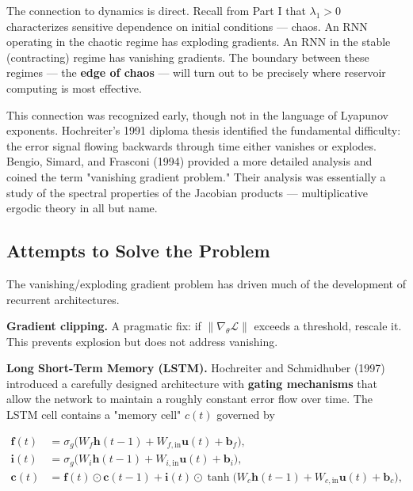 The connection to dynamics is direct. Recall from Part I that $\lambda_1 > 0$ characterizes sensitive dependence on initial conditions --- chaos. An RNN operating in the chaotic regime has exploding gradients. An RNN in the stable (contracting) regime has vanishing gradients. The boundary between these regimes --- the \textbf{edge of chaos} --- will turn out to be precisely where reservoir computing is most effective.

\begin{remark}
This connection was recognized early, though not in the language of Lyapunov exponents. Hochreiter's 1991 diploma thesis identified the fundamental difficulty: the error signal flowing backwards through time either vanishes or explodes. Bengio, Simard, and Frasconi (1994) provided a more detailed analysis and coined the term "vanishing gradient problem." Their analysis was essentially a study of the spectral properties of the Jacobian products --- multiplicative ergodic theory in all but name.
\end{remark}


\subsection{Attempts to Solve the Problem}\label{sec:13.3.4}

The vanishing/exploding gradient problem has driven much of the development of recurrent architectures.

\textbf{Gradient clipping.} A pragmatic fix: if $\|\nabla_\theta \mathcal{L}\|$ exceeds a threshold, rescale it. This prevents explosion but does not address vanishing.

\textbf{Long Short-Term Memory (LSTM).} Hochreiter and Schmidhuber (1997) introduced a carefully designed architecture with \textbf{gating mechanisms} that allow the network to maintain a roughly constant error flow over time. The LSTM cell contains a "memory cell" $c(t)$ governed by

\[
\begin{aligned}
\mathbf{f}(t) &= \sigma_g\!\big(W_f \mathbf{h}(t-1) + W_{f,\text{in}} \mathbf{u}(t) + \mathbf{b}_f\big), \\
\mathbf{i}(t) &= \sigma_g\!\big(W_i \mathbf{h}(t-1) + W_{i,\text{in}} \mathbf{u}(t) + \mathbf{b}_i\big), \\
\mathbf{c}(t) &= \mathbf{f}(t) \odot \mathbf{c}(t-1) + \mathbf{i}(t) \odot \tanh\!\big(W_c \mathbf{h}(t-1) + W_{c,\text{in}} \mathbf{u}(t) + \mathbf{b}_c\big),
\end{aligned}
\]

